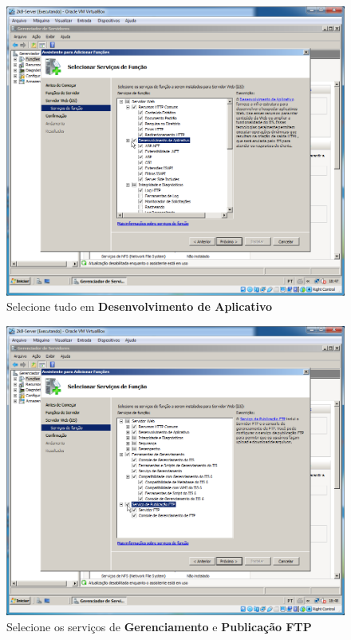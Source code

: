 \documentclass[10pt]{article}
\begin{document}
\begin{figure}[H]
    \centering
    \caption{Selecione tudo em \textbf{Desenvolvimento de Aplicativo}}
    \label{fig:IIS014}
    \includegraphics[width=\linewidth]{images/IIS/IIS014.png}
\end{figure}
\begin{figure}[H]
    \centering
    \caption{Selecione os serviços de \textbf{Gerenciamento} e \textbf{Publicação FTP}}
    \label{fig:IIS018}
    \includegraphics[width=\linewidth]{images/IIS/IIS018.png}
\end{figure}
\end{document}
